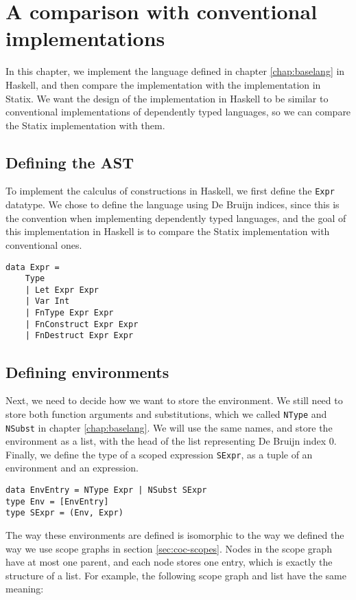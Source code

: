 \chapter{A comparison with conventional implementations}
\label{ch:comp-haskell}

In this chapter, we implement the language defined in chapter \ref{chap:baselang} in Haskell, and then compare the implementation with the implementation in Statix. We want the design of the implementation in Haskell to be similar to conventional implementations of dependently typed languages, so we can compare the Statix implementation with them.

\section{Defining the AST}
To implement the calculus of constructions in Haskell, we first define the \verb|Expr| datatype. We chose to define the language using De Bruijn indices, since this is the convention when implementing dependently typed languages, and the goal of this implementation in Haskell is to compare the Statix implementation with conventional ones. 
\begin{lstlisting}
data Expr =
	Type
	| Let Expr Expr
	| Var Int
	| FnType Expr Expr
	| FnConstruct Expr Expr
	| FnDestruct Expr Expr
\end{lstlisting}

\section{Defining environments}

Next, we need to decide how we want to store the environment. We still need to store both function arguments and substitutions, which we called \verb|NType| and \verb|NSubst| in chapter \ref{chap:baselang}. We will use the same names, and store the environment as a list, with the head of the list representing De Bruijn index 0. Finally, we define the type of a scoped expression \verb|SExpr|, as a tuple of an environment and an expression.
\begin{lstlisting}
data EnvEntry = NType Expr | NSubst SExpr
type Env = [EnvEntry]
type SExpr = (Env, Expr)
\end{lstlisting}

The way these environments are defined is isomorphic to the way we defined the way we use scope graphs in section \ref{sec:coc-scopes}. Nodes in the scope graph have at most one parent, and each node stores one entry, which is exactly the structure of a list. For example, the following scope graph and list have the same meaning:

